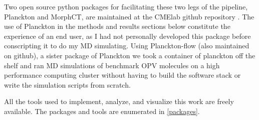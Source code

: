 Two open source python packages for
facilitating these two legs of the pipeline, Planckton and MorphCT, are maintained at 
the CMElab github repository \cite{cmelab}.
The use of Planckton in the methods and results sections below
constitute the experience of an end user, as I had not personally developed this package before conscripting it
to do my MD simulating. 
Using Planckton-flow (also maintained on github), a sister package
of Planckton we took a container of planckton off the shelf and ran MD simulations of benchmark OPV
molecules on a high performance computing cluster without having to build the software stack or write the
simulation scripts from scratch. 

All the tools used to implement, analyze, and
visualize this work are freely available. 
The packages and tools are enumerated in \autoref{packages}.
